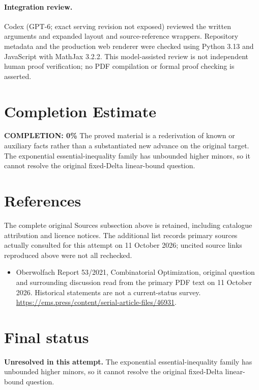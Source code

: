 \documentclass[11pt]{article}
\begin{document}
\paragraph{Integration review.} Codex (GPT-6; exact serving revision not exposed) reviewed the written arguments and expanded layout and source-reference wrappers. Repository metadata and the production web renderer were checked using Python 3.13 and JavaScript with MathJax 3.2.2. This model-assisted review is not independent human proof verification; no PDF compilation or formal proof checking is asserted.

\section{Completion Estimate}
\noindent\textbf{COMPLETION: 0\%}
The proved material is a rederivation of known or auxiliary facts rather than a substantiated new advance on the original target. The exponential essential-inequality family has unbounded higher minors, so it cannot resolve the original fixed-Delta linear-bound question.
\section{References}
The complete original Sources subsection above is retained, including catalogue attribution and licence notices. The additional list records primary sources actually consulted for this attempt on 11 October 2026; uncited source links reproduced above were not all rechecked.
\begin{itemize}
\item Oberwolfach Report 53/2021, Combinatorial Optimization, original question and surrounding discussion read from the primary PDF text on 11 October 2026. Historical statements are not a current-status survey. \url{https://ems.press/content/serial-article-files/46931}.
\end{itemize}
\section{Final status}
\textbf{Unresolved in this attempt.} The exponential essential-inequality family has unbounded higher minors, so it cannot resolve the original fixed-Delta linear-bound question.
\end{document}

